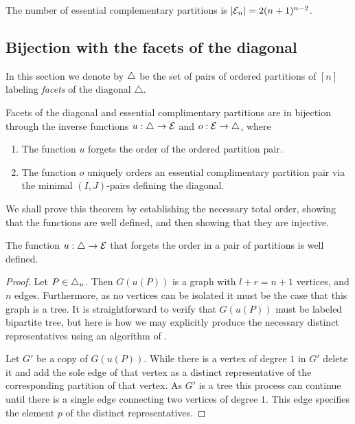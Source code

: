 \begin{corollary}
The number of essential complementary partitions is $|\mathcal{E}_n| = 2(n+1)^{n-2}$.
\end{corollary}

\subsection{Bijection with the facets of the diagonal}

In this section we denote by $\triangle$ be the set of pairs of ordered partitions of $[n]$ labeling \emph{facets} of the diagonal $\triangle$.

\begin{thm}
\label{thm:facets}
Facets of the diagonal and essential complimentary partitions are in bijection through the inverse functions $u:\triangle \to \mathcal{E}$ and $o:\mathcal{E}\to \triangle$, where
\begin{enumerate}
    \item The function $u$ forgets the order of the ordered partition pair.
    \item The function $o$ uniquely orders an essential complimentary partition pair via the minimal $(I,J)$-pairs defining the diagonal. 
\end{enumerate}
\end{thm}
We shall prove this theorem by establishing the necessary total order, showing that the functions are well defined, and then showing that they are injective.

\begin{lemma} 
\label{l:u-well-defined}
The function $u:\triangle \to \mathcal{E}$ that forgets the order in a pair of partitions is well defined.
\end{lemma}
\begin{proof}
Let $P \in \triangle_n$. Then $G(u(P))$ is a graph with $l+r=n+1$ vertices, and $n$ edges. Furthermore, as no vertices can be isolated it must be the case that this graph is a tree. 
It is straightforward to verify that $G(u(P))$ must be labeled bipartite tree, but here is how we may explicitly produce the necessary distinct representatives using an algorithm of \cite[Theorem 2]{kajitani1982number}.

Let $G'$ be a copy of $G(u(P))$. 
While there is a vertex of degree $1$ in $G'$ delete it and add the sole edge of that vertex as a distinct representative of the corresponding partition of that vertex. 
As $G'$ is a tree this process can continue until there is a single edge connecting two vertices of degree $1$. 
This edge specifies the element $p$ of the distinct representatives.
\end{proof}

